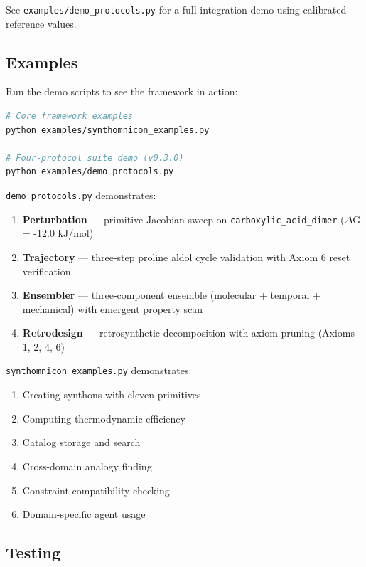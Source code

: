 \documentclass[12pt,a4paper]{article}
\begin{document}
See \texttt{examples/demo\_protocols.py} for a full integration demo using calibrated reference values.

\subsection{Examples}

Run the demo scripts to see the framework in action:

\begin{lstlisting}[language=bash]
# Core framework examples
python examples/synthomnicon_examples.py

# Four-protocol suite demo (v0.3.0)
python examples/demo_protocols.py
\end{lstlisting}

\texttt{demo\_protocols.py} demonstrates:

\begin{enumerate}
    \item \textbf{Perturbation} --- primitive Jacobian sweep on \texttt{carboxylic\_acid\_dimer} ($\Delta$G = -12.0 kJ/mol)
    \item \textbf{Trajectory} --- three-step proline aldol cycle validation with Axiom 6 reset verification
    \item \textbf{Ensembler} --- three-component ensemble (molecular + temporal + mechanical) with emergent property scan
    \item \textbf{Retrodesign} --- retrosynthetic decomposition with axiom pruning (Axioms 1, 2, 4, 6)
\end{enumerate}

\texttt{synthomnicon\_examples.py} demonstrates:

\begin{enumerate}
    \item Creating synthons with eleven primitives
    \item Computing thermodynamic efficiency
    \item Catalog storage and search
    \item Cross-domain analogy finding
    \item Constraint compatibility checking
    \item Domain-specific agent usage
\end{enumerate}

\subsection{Testing}
\end{document}

